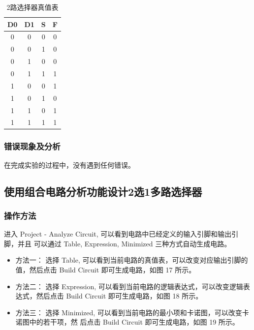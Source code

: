 \documentclass{article}
\begin{document}
    \begin{table}[H]
    \centering
    \begin{tabular}{|c c c|c|}
        \hline
        D0 & D1 & S & F \\ \hline
        0 & 0 & 0 & 0 \\ \hline
        0 & 0 & 1 & 0 \\ \hline
        0 & 1 & 0 & 0 \\ \hline
        0 & 1 & 1 & 1 \\ \hline
        1 & 0 & 0 & 1 \\ \hline
        1 & 0 & 1 & 0 \\ \hline
        1 & 1 & 0 & 1 \\ \hline
        1 & 1 & 1 & 1 \\ \hline
    \end{tabular}
    \caption{2路选择器真值表}
    \end{table}

    \subsubsection{错误现象及分析}
    在完成实验的过程中，没有遇到任何错误。

    \subsection{使用组合电路分析功能设计2选1多路选择器}

    \subsubsection{操作方法}
    进入 Project - Analyze Circuit, 可以看到电路中已经定义的输入引脚和输出引脚，并且
    可以通过 Table, Expression, Minimized 三种方式自动生成电路。
    \begin{itemize}
        \item 方法一： 选择 Table, 可以看到当前电路的真值表，可以改变对应输出引脚的值，然后点击 Build
    Circuit 即可生成电路，如图 17 所示。 
        \item 方法二： 选择 Expression, 可以看到当前电路的逻辑表达式，可以改变逻辑表达式，然后点击 Build
    Circuit 即可生成电路，如图 18 所示。
        \item 方法三： 选择 Minimized, 可以看到当前电路的最小项和卡诺图，可以改变卡诺图中的若干项，然
    后点击 Build Circuit 即可生成电路，如图 19 所示。
    \end{itemize}
    
\end{document}
